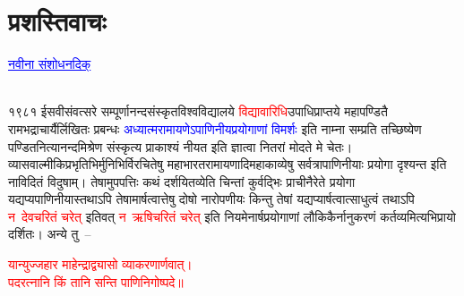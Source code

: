 %
%
%

\renewcommand\chaptername{}
\chapter[प्रशस्तिवाचः]{प्रशस्तिवाचः}
\fontsize{18}{27}\selectfont
\centering\textcolor{blue}{\underline{नवीना संशोधनदिक्}}\nopagebreak\\
\vspace{4mm}
\fontsize{14}{21}\selectfont
{}\nopagebreak\\
\vspace{4mm}
\fontsize{14}{21}\selectfont
\begin{sloppypar}\justifying\noindent\hspace{10mm} १९८१ ईसवी\-संवत्सरे सम्पूर्णानन्द\-संस्कृत\-विश्वविद्यालये \textcolor{red}{विद्यावारिधि}\-उपाधि\-प्राप्तये महापण्डितै रामभद्राचार्यैर्लिखितः प्रबन्धः \textcolor{blue}{अध्यात्मरामायणेऽपाणिनीय\-प्रयोगाणां विमर्शः} इति नाम्ना सम्प्रति तच्छिष्येण पण्डित\-नित्यानन्द\-मिश्रेण संस्कृत्य प्राकाश्यं नीयत इति ज्ञात्वा नितरां मोदते मे चेतः। व्यास\-वाल्मीकि\-प्रभृतिभिर्मुनिभिर्विरचितेषु महाभारत\-रामायणादि\-महाकाव्येषु सर्वत्रापाणिनीयाः प्रयोगा दृश्यन्त इति नाविदितं विदुषाम्। तेषामुपपत्तिः कथं दर्शयितव्येति चिन्तां कुर्वद्भिः प्राचीनैरेते प्रयोगा यद्यप्यपाणिनीयास्तथाऽपि तेषामार्षत्वात्तेषु दोषो नारोपणीयः किन्तु तेषां यद्यप्यार्षत्वात्साधुत्वं तथाऽपि \textcolor{red}{न~देवचरितं चरेत्} इतिवत् \textcolor{red}{न~ऋषिचरितं चरेत्} इति नियमेनार्ष\-प्रयोगाणां लौकिकैर्नानुकरणं कर्तव्यमित्यभि\-प्रायो दर्शितः। अन्ये तु~–\end{sloppypar}
\centering\textcolor{red}{यान्युज्जहार माहेन्द्राद्व्यासो व्याकरणार्णवात्।\nopagebreak\\
पदरत्नानि किं तानि सन्ति पाणिनिगोष्पदे॥}\nopagebreak\\
